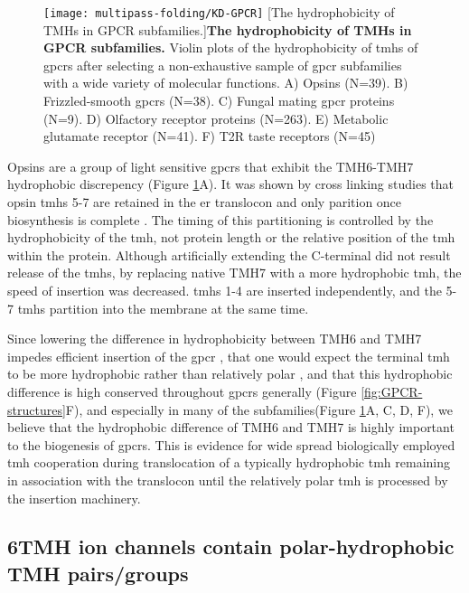 \begin{figure}[!ht]
\centering
\texttt{[image: multipass-folding/KD-GPCR]}
		[The hydrophobicity of TMHs in GPCR subfamilies.]{\textbf{The hydrophobicity of TMHs in GPCR subfamilies.}
    Violin plots of the hydrophobicity of \gls{tmh}s of \gls{gpcr}s after selecting a non-exhaustive sample of \gls{gpcr} subfamilies with a wide variety of molecular functions.
    A) Opsins (N=39).
    B) Frizzled-smooth \gls{gpcr}s (N=38).
    C) Fungal mating \gls{gpcr} proteins (N=9).
    D) Olfactory receptor proteins (N=263).
    E) Metabolic glutamate receptor (N=41).
    F) T2R taste receptors (N=45)
    }

\label{fig:KD-GPCR}
\end{figure}

Opsins are a group of light sensitive \gls{gpcr}s that exhibit the TMH6\--TMH7 hydrophobic discrepency (Figure \ref{fig:KD-GPCR}A).
It was shown by cross linking studies that opsin \gls{tmh}s 5-7 are retained in the \gls{er} translocon and only parition once biosynthesis is complete \cite{Ismail2008}.
The timing of this partitioning is controlled by the hydrophobicity of the \gls{tmh}, not protein length or the relative position of the \gls{tmh} within the protein.
Although artificially extending the C-terminal did not result release of the \gls{tmh}s, by replacing native TMH7 with a more hydrophobic \gls{tmh}, the speed of insertion was decreased.
\gls{tmh}s 1-4 are inserted independently, and the 5-7 \gls{tmh}s partition into the membrane at the same time.

Since lowering the difference in hydrophobicity between TMH6 and TMH7 impedes efficient insertion of the \gls{gpcr} \cite{Ismail2008}, that one would expect the terminal \gls{tmh} to be more hydrophobic rather than relatively polar \cite{Virkki2014}, and that this hydrophobic difference is high conserved throughout \gls{gpcr}s generally (Figure \ref{fig:GPCR-structures}F), and especially in many of the subfamilies(Figure \ref{fig:KD-GPCR}A, C, D, F), we believe that the hydrophobic difference of TMH6 and TMH7 is highly important to the biogenesis of \gls{gpcr}s. This is evidence for wide spread biologically employed \gls{tmh} cooperation during translocation of a typically hydrophobic \gls{tmh} remaining in association with the translocon until the relatively polar \gls{tmh} is processed by the insertion machinery.


\subsection{6TMH ion channels contain polar-hydrophobic TMH pairs/groups}

